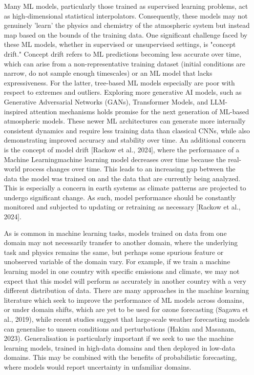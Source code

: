 \documentclass[gmd, manuscript]{copernicus}
\begin{document}
Many ML models, particularly those trained as supervised learning problems, act as high-dimensional statistical interpolators. Consequently, these models may not genuinely 'learn' the physics and chemistry of the atmospheric system but instead map based on the bounds of the training data. One significant challenge faced by these ML models, whether in supervised or unsupervised settings, is "concept drift." Concept drift refers to ML predictions becoming less accurate over time, which can arise from a non-representative training dataset (initial conditions are narrow, do not sample enough timescales) or an ML model that lacks expressiveness. For the latter, tree-based ML models especially are poor with respect to extremes and outliers. Exploring more generative AI models, such as Generative Adversarial Networks (GANs), Transformer Models, and LLM-inspired attention mechanisms holds promise for the next generation of ML-based atmospheric models. These newer ML architectures can generate more internally consistent dynamics and require less training data than classical CNNs, while also demonstrating improved accuracy and stability over time.   An additional concern is the concept of model drift [Rackow et al., 2024], where the performance of a Machine Learningmachine learning model decreases over time because the real-world process changes over time. This leads to an increasing gap between the data the model was trained on and the data that are currently being analyzed. This is especially a concern in earth systems as climate patterns are projected to undergo significant change. As such, model performance should be constantly monitored and subjected to updating or retraining as necessary [Rackow et al., 2024].

As is common in machine learning tasks, models trained on data from one domain may not necessarily transfer to another domain, where the underlying task and physics remains the same, but perhaps some spurious feature or unobserved variable of the domain vary. For example, if we train a machine learning model in one country with specific emissions and climate, we may not expect that this model will perform as accurately in another country with a very different distribution of data. There are many approaches in the machine learning literature which seek to improve the performance of ML models across domains, or under domain shifts, which are yet to be used for ozone forecasting (Sagawa et al., 2019), while recent studies suggest that large-scale weather forecasting models can generalise to unseen conditions and perturbations (Hakim and Masanam, 2023). Generalisation is particularly important if we seek to use the machine learning models, trained in high-data domains and then deployed in low-data domains. This may be combined with the benefits of probabilistic forecasting, where models would report uncertainty in unfamiliar domains.
\end{document}
